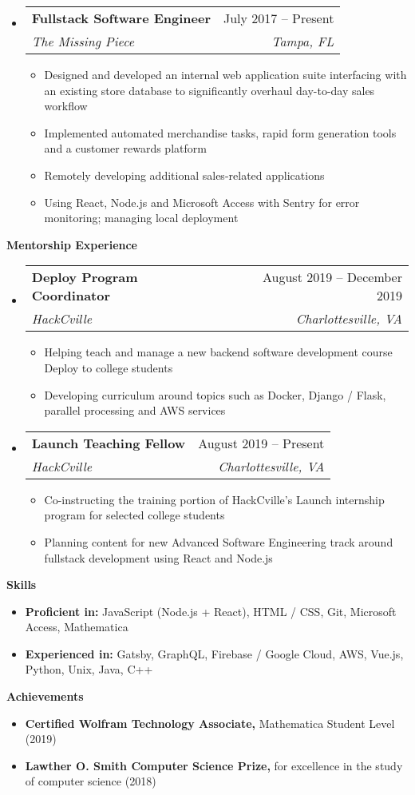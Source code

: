 \documentclass[letterpaper,12pt]{article}[leftmargin=*]
\makeatletter
\def \entryspacing {-0pt}
\renewcommand{\section}[2]{\vspace{5pt}
  \colorbox{secondary}{\color{white}\raggedbottom\normalsize\textbf{{#1}{\hspace{7pt}#2}}}
}
\newcommand{\resumeEntryStart}{\begin{itemize}[leftmargin=2.5mm]}
\newcommand{\resumeEntryEnd}{\end{itemize}\vspace{\entryspacing}}
\newcommand{\resumeItemListStart}{\begin{itemize}[leftmargin=4.5mm]}
\newcommand{\resumeItemListEnd}{\end{itemize}}
\newcommand{\resumeItem}[1]{
  \item\small{
    {#1 \vspace{-2pt}}
  }
}
\newcommand{\resumeEntryTSDL}[4]{
  \vspace{-1pt}\item[]
    \begin{tabular*}{0.97\textwidth}{l@{\extracolsep{\fill}}r}
      \textbf{\color{primary}#1} & {\firabook\color{accent}\small#2} \\
      \textit{\color{accent}\small#3} & \textit{\color{accent}\small#4} \\
    \end{tabular*}\vspace{-6pt}
}
\newcommand{\resumeEntryS}[2]{
  \item[]\small{
    \textbf{\color{primary}#1} #2\vspace{-6pt}
  }
}
\makeatother
\begin{document}
  \resumeEntryStart
    \resumeEntryTSDL
      {Fullstack Software Engineer}{July 2017 -- Present}
      {The Missing Piece}{Tampa, FL}
    \resumeItemListStart
      \resumeItem {Designed and developed an internal web application suite interfacing with an existing store database to significantly overhaul day-to-day sales workflow}
      \resumeItem {Implemented automated merchandise tasks, rapid form generation tools and a customer rewards platform}
      \resumeItem {Remotely developing additional sales-related applications}
      \resumeItem {Using React, Node.js and Microsoft Access with Sentry for error monitoring; managing local deployment}
    \resumeItemListEnd
  \resumeEntryEnd

\section{\faUsers}{Mentorship Experience}

  \resumeEntryStart
    \resumeEntryTSDL
      {Deploy Program Coordinator}{August 2019 -- December 2019}
      {HackCville}{Charlottesville, VA}
    \resumeItemListStart
      \resumeItem {Helping teach and manage a new backend software development course Deploy to college students}
      \resumeItem {Developing curriculum around topics such as Docker, Django / Flask, parallel processing and AWS services}
    \resumeItemListEnd
  \resumeEntryEnd

  \resumeEntryStart
    \resumeEntryTSDL
      {Launch Teaching Fellow}{August 2019 -- Present}
      {HackCville}{Charlottesville, VA}
    \resumeItemListStart
      \resumeItem {Co-instructing the training portion of HackCville’s Launch internship program for selected college students}
      \resumeItem {Planning content for new Advanced Software Engineering track around fullstack development using React and Node.js}
    \resumeItemListEnd
  \resumeEntryEnd

\section{\faGears}{Skills}
 \resumeEntryStart
  \resumeEntryS{Proficient in:} {JavaScript (Node.js + React), HTML / CSS, Git, Microsoft Access, Mathematica}
  \resumeEntryS{Experienced in:} {Gatsby, GraphQL, Firebase / Google Cloud, AWS, Vue.js, Python, Unix, Java, C++}
 \resumeEntryEnd

 \section{\faStar}{Achievements}
 \resumeEntryStart
  \resumeEntryS{Certified Wolfram Technology Associate,} { Mathematica Student Level (2019)}
  \resumeEntryS{Lawther O. Smith Computer Science Prize,} {for excellence in the study of computer science (2018)}
 \resumeEntryEnd
\end{document}
